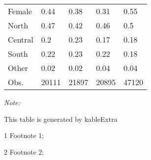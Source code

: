 \begin{table}
\begin{threeparttable}
\begin{tabular}[t]{lllll}
\hspace{1em}Female & 0.44 & 0.38 & 0.31 & 0.55\\
\hspace{1em}North & 0.47 & 0.42 & 0.46 & 0.5\\
\hspace{1em}Central & 0.2 & 0.23 & 0.17 & 0.18\\
\hspace{1em}South & 0.22 & 0.23 & 0.22 & 0.18\\
\hspace{1em}Other & 0.02 & 0.02 & 0.04 & 0.04\\
Obs. & 20111 & 21897 & 20895 & 47120\\
\bottomrule
\end{tabular}
\begin{tablenotes}
\item \textit{Note: } 
\item This table is generated by kableExtra
\item[1] Footnote 1; 
\item[2] Footnote 2; 
\end{tablenotes}
\end{threeparttable}
\end{table}
